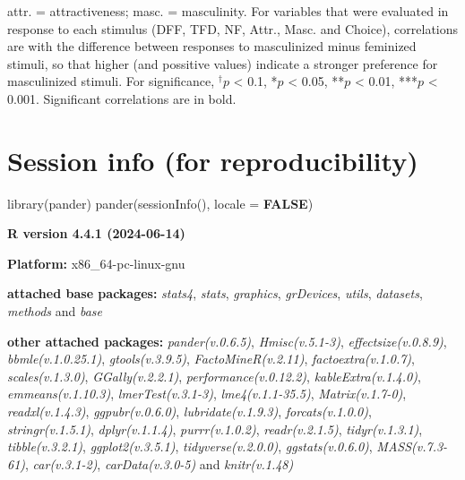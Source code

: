 \documentclass[
  bookmarksnumbered]{article}
\newenvironment{Shaded}{\begin{snugshade}}{\end{snugshade}}
\newcommand{\AttributeTok}[1]{\textcolor[rgb]{0.80,0.80,0.80}{#1}}
\newcommand{\ConstantTok}[1]{\textcolor[rgb]{0.86,0.64,0.64}{\textbf{#1}}}
\newcommand{\FunctionTok}[1]{\textcolor[rgb]{0.94,0.94,0.56}{#1}}
\newcommand{\NormalTok}[1]{\textcolor[rgb]{0.80,0.80,0.80}{#1}}
\begin{document}
\begin{table}[H]
{\begin{threeparttable}
\begin{tablenotes}[para]
                            attr. = attractiveness; 
                            masc. = masculinity. For variables that were evaluated in response to each stimulus 
                            (DFF, TFD, NF, Attr., Masc. and Choice), correlations are
                            with the difference between responses to masculinized minus 
                            feminized stimuli, so that higher (and possitive values) indicate 
                            a stronger preference for masculinized stimuli. For significance, $^{\dagger}p$ < 0.1, *$p$ < 0.05, **$p$ < 0.01, ***$p$ < 0.001. Significant correlations are in bold.
\end{tablenotes}
\end{threeparttable}}
\end{table}

\section{Session info (for reproducibility)}\label{session}

\begin{Shaded}
\begin{Highlighting}[]
\FunctionTok{library}\NormalTok{(pander)}
\FunctionTok{pander}\NormalTok{(}\FunctionTok{sessionInfo}\NormalTok{(), }\AttributeTok{locale =} \ConstantTok{FALSE}\NormalTok{)}
\end{Highlighting}
\end{Shaded}

\textbf{R version 4.4.1 (2024-06-14)}

\textbf{Platform:} x86\_64-pc-linux-gnu

\textbf{attached base packages:}
\emph{stats4}, \emph{stats}, \emph{graphics}, \emph{grDevices}, \emph{utils}, \emph{datasets}, \emph{methods} and \emph{base}

\textbf{other attached packages:}
\emph{pander(v.0.6.5)}, \emph{Hmisc(v.5.1-3)}, \emph{effectsize(v.0.8.9)}, \emph{bbmle(v.1.0.25.1)}, \emph{gtools(v.3.9.5)}, \emph{FactoMineR(v.2.11)}, \emph{factoextra(v.1.0.7)}, \emph{scales(v.1.3.0)}, \emph{GGally(v.2.2.1)}, \emph{performance(v.0.12.2)}, \emph{kableExtra(v.1.4.0)}, \emph{emmeans(v.1.10.3)}, \emph{lmerTest(v.3.1-3)}, \emph{lme4(v.1.1-35.5)}, \emph{Matrix(v.1.7-0)}, \emph{readxl(v.1.4.3)}, \emph{ggpubr(v.0.6.0)}, \emph{lubridate(v.1.9.3)}, \emph{forcats(v.1.0.0)}, \emph{stringr(v.1.5.1)}, \emph{dplyr(v.1.1.4)}, \emph{purrr(v.1.0.2)}, \emph{readr(v.2.1.5)}, \emph{tidyr(v.1.3.1)}, \emph{tibble(v.3.2.1)}, \emph{ggplot2(v.3.5.1)}, \emph{tidyverse(v.2.0.0)}, \emph{ggstats(v.0.6.0)}, \emph{MASS(v.7.3-61)}, \emph{car(v.3.1-2)}, \emph{carData(v.3.0-5)} and \emph{knitr(v.1.48)}
\end{document}
